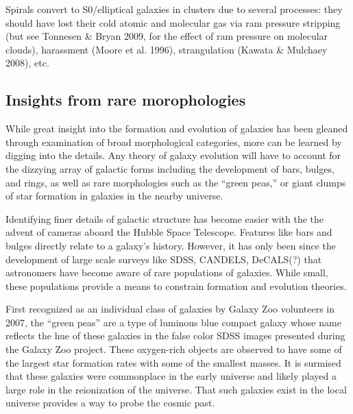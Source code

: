 Spirals convert to S0/elliptical galaxies in clusters due to several processes: they should have lost their cold atomic and molecular gas via ram pressure stripping (but see Tonnesen \& Bryan 2009, for the effect of ram
pressure on molecular clouds), harassment (Moore et al. 1996),
strangulation (Kawata \& Mulchaey 2008), etc.



\subsection{Insights from rare morophologies}
While great insight into the formation and evolution of galaxies has been gleaned through examination of broad morphological categories, more can be learned by digging into the details. Any theory of galaxy evolution will have to account for the dizzying array of galactic forms including the development of bars, bulges, and rings, as well as rare morphologies such as the ``green peas,'' or giant clumps of star formation in galaxies in the nearby universe.

Identifying finer details of galactic structure has become easier with the the advent of cameras aboard the Hubble Space Telescope. Features like bars and bulges directly relate to a galaxy's history. However, it has only been since the development of large scale surveys like SDSS, CANDELS, DeCALS(?) that astronomers have become aware of rare populations of galaxies. While small, these populations provide a means to constrain formation and evolution theories. 

First recognized as an individual class of galaxies by Galaxy Zoo volunteers in 2007, the ``green peas'' are a type of luminous blue compact galaxy whose name reflects the hue of these galaxies in the false color SDSS images presented during the Galaxy Zoo project. These oxygen-rich objects are observed to have some of the largest star formation rates with some of the smallest masses. It is surmised that these galaxies were commonplace in the early universe and likely played a large role in the reionization of the universe. That such galaxies exist in the local universe provides a way to probe the cosmic past. 

